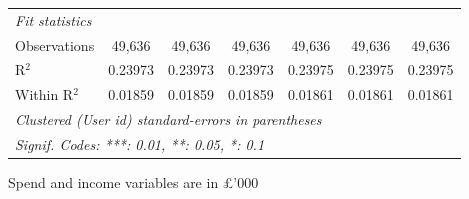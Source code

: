 \begin{table}[htbp]
\begin{threeparttable}[b]
\begin{tabular}{lcccccc}
         \midrule
         \emph{Fit statistics}\\
         Observations        & 49,636        & 49,636        & 49,636        & 49,636        & 49,636        & 49,636\\  
         R$^2$               & 0.23973       & 0.23973       & 0.23973       & 0.23975       & 0.23975       & 0.23975\\  
         Within R$^2$        & 0.01859       & 0.01859       & 0.01859       & 0.01861       & 0.01861       & 0.01861\\  
         \midrule \midrule
         \multicolumn{7}{l}{\emph{Clustered (User id) standard-errors in parentheses}}\\
         \multicolumn{7}{l}{\emph{Signif. Codes: ***: 0.01, **: 0.05, *: 0.1}}\\
      \end{tabular}
      
      \begin{tablenotes}\footnotesize
         \item Spend and income variables are in £'000
      \end{tablenotes}
   \end{threeparttable}
\end{table}


